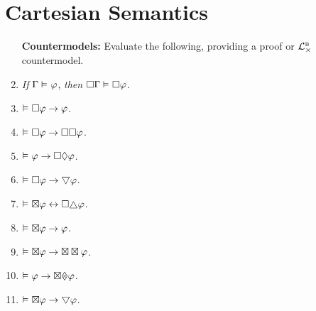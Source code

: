 \documentclass[a4paper, 11pt]{article}                  %
\begin{document}

\section{Cartesian Semantics}

\begin{enumerate}

	\item[\bf Countermodels:] Evaluate the following, providing a proof or $\BLC$ countermodel.

    \item \textit{If} $\Gamma \MLmodels[] \metaA$, \textit{then} $\Box\Gamma \MLmodels[] \Box\metaA$.

    \item $\MLmodels[] \Box\metaA \rightarrow \metaA$.

    \item $\MLmodels[] \Box\metaA \rightarrow \Box\Box\metaA$.

    \item $\MLmodels[] \metaA \rightarrow \Box\Diamond\metaA$.

    \item $\MLmodels[] \Box\metaA \rightarrow \sometimes\metaA$.

    \item $\MLmodels[] \boxtimes\metaA \leftrightarrow \Box\always\metaA$.

    \item $\MLmodels[] \boxtimes\metaA \rightarrow \metaA$.

    \item $\MLmodels[] \boxtimes\metaA \rightarrow \boxtimes\boxtimes\metaA$.

    \item $\MLmodels[] \metaA \rightarrow \boxtimes\diamondtimes\metaA$.

    \item $\MLmodels[] \boxtimes\metaA \rightarrow \sometimes\metaA$.

\end{enumerate}
\end{document}
